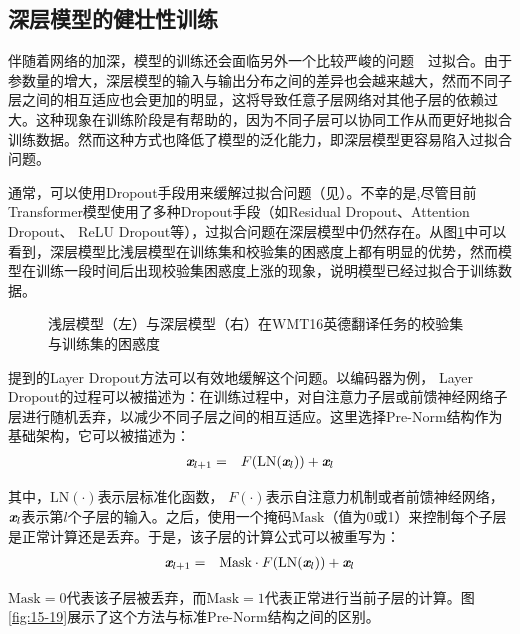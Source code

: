\subsection{深层模型的健壮性训练}


\parinterval 伴随着网络的加深，模型的训练还会面临另外一个比较严峻的问题\ \dash \ 过拟合。由于参数量的增大，深层模型的输入与输出分布之间的差异也会越来越大，然而不同子层之间的相互适应也会更加的明显，这将导致任意子层网络对其他子层的依赖过大。这种现象在训练阶段是有帮助的，因为不同子层可以协同工作从而更好地拟合训练数据。然而这种方式也降低了模型的泛化能力，即深层模型更容易陷入过拟合问题。

\parinterval 通常，可以使用Dropout手段用来缓解过拟合问题（见{\chapterthirteen}）。不幸的是,尽管目前Transformer模型使用了多种Dropout手段（如Residual Dropout、Attention Dropout、 ReLU Dropout等），过拟合问题在深层模型中仍然存在。从图\ref{fig:15-18}中可以看到，深层模型比浅层模型在训练集和校验集的困惑度上都有明显的优势，然而模型在训练一段时间后出现校验集困惑度上涨的现象，说明模型已经过拟合于训练数据。

\begin{figure}[htp]
\centering

\caption{浅层模型（左）与深层模型（右）在WMT16英德翻译任务的校验集与训练集的困惑度}
\label{fig:15-18}
\end{figure}

\parinterval {\chapterthirteen}提到的Layer Dropout方法可以有效地缓解这个问题。以编码器为例， Layer Dropout的过程可以被描述为：在训练过程中，对自注意力子层或前馈神经网络子层进行随机丢弃，以减少不同子层之间的相互适应。这里选择Pre-Norm结构作为基础架构，它可以被描述为：
\begin{eqnarray}
\textbf{\em x}_{l+1} &=& F(\textrm{LN}(\textbf{\em x}_l)) + \textbf{\em x}_l
\label{eq:15-51}
\end{eqnarray}

\noindent 其中，$\textrm{LN}( \cdot )$表示层标准化函数， $F( \cdot )$表示自注意力机制或者前馈神经网络，$\textbf{\em x}_l$表示第$l$个子层的输入。之后，使用一个掩码$\textrm{Mask}$（值为0或1）来控制每个子层是正常计算还是丢弃。于是，该子层的计算公式可以被重写为：
\begin{eqnarray}
\textbf{\em x}_{l+1} &=& \textrm{Mask} \cdot F(\textrm{LN}(\textbf{\em x}_l))+\textbf{\em x}_l
\label{eq:15-52}
\end{eqnarray}

\noindent $\textrm{Mask}=0$代表该子层被丢弃，而$\textrm{Mask}=1$代表正常进行当前子层的计算。图\ref{fig:15-19}展示了这个方法与标准Pre-Norm结构之间的区别。

